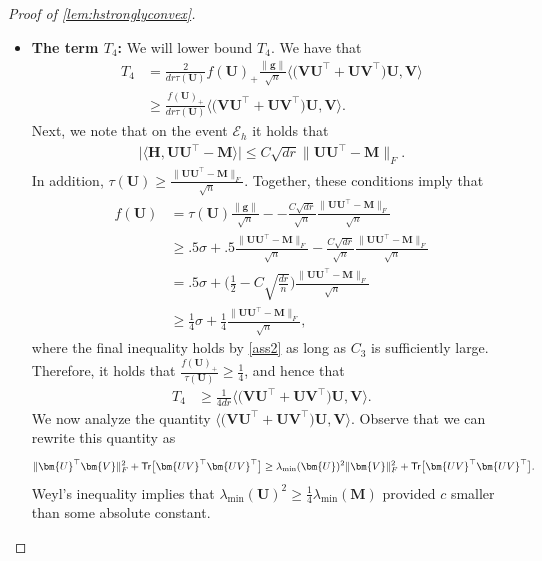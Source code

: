 \documentclass[10pt]{article}
\renewcommand{\t}{^{\top}}
\theoremstyle{definition}
\begin{document}
\begin{proof}[Proof of \cref{lem:hstronglyconvex}]
\begin{itemize}
\item \textbf{The term $T_4$:} We will lower bound $T_4$. We have that
\begin{align}
    T_4 &= \frac{2}{dr \tau(\bm{U})} f(\bm{U})_+ \frac{\|\bm{g}\|}{\sqrt{n}} \bigg \langle \bigg( \bm{VU}\t + \bm{UV}\t \bigg) \bm{U}, \bm{V} \bigg \rangle \\
    &\geq \frac{f(\bm{U})_+}{dr \tau(\bm{U})}  \bigg \langle \bigg( \bm{VU}\t + \bm{UV}\t \bigg) \bm{U}, \bm{V} \bigg \rangle.
\end{align}
Next, we note that on the event $\mathcal{E}_h$ it holds that
\begin{align}
    \bigg| \langle \bm{H}, \bm{UU}\t - \bm{M} \rangle \bigg| \leq C \sqrt{dr} \| \bm{UU}\t - \bm{M} \|_F.
\end{align}
In addition, $\tau(\bm{U}) \geq \frac{\|\bm{UU}\t - \bm{M}\|_F}{\sqrt{n}} $.  Together, these conditions imply that
\begin{align}
    f(\bm{U}) &= \tau(\bm{U}) \frac{\|\bm{g}\|}{\sqrt{n}} - - \frac{C \sqrt{dr}}{\sqrt{n}} \frac{\|\bm{UU}\t - \bm{M}\|_F}{\sqrt{n}}\\
    &\geq .5 \sigma + .5 \frac{\|\bm{UU}\t - \bm{M}\|_F}{\sqrt{n}} - \frac{C \sqrt{dr}}{\sqrt{n}} \frac{\|\bm{UU}\t - \bm{M}\|_F}{\sqrt{n}} \\
    &= .5\sigma + \bigg( \frac{1}{2} - C\sqrt{\frac{dr}{n}} \bigg) \frac{\|\bm{UU}\t - \bm{M}\|_F}{\sqrt{n}} \\
    &\geq \frac{1}{4} \sigma + \frac{1}{4} \frac{\|\bm{UU}\t - \bm{M}\|_F}{\sqrt{n}},
\end{align}
where the final inequality holds by \cref{ass2} as long as $C_3$ is sufficiently large.  Therefore, it holds that $\frac{f(\bm{U})_+}{\tau(\bm{U})} \geq \frac{1}{4}$, and hence that 
\begin{align}
    T_4 &\geq     
    \frac{1}{4dr} \bigg \langle \bigg( \bm{VU}\t + \bm{UV}\t \bigg) \bm{U}, \bm{V} \bigg \rangle. 
\end{align}
We now analyze the quantity $\bigg \langle \bigg( \bm{VU}\t + \bm{UV}\t \bigg) \bm{U}, \bm{V} \bigg \rangle$.  Observe that we can rewrite this quantity as
\begin{align}
    \| \bm{U}\t \bm{V} \|_F^2 + {\sf Tr}\big[ \bm{UV}\t \bm{UV}\t \big] \geq \lambda_{\min}(\bm{U})^2 \| \bm{V} \|_F^2 + {\sf Tr}\big[ \bm{UV}\t \bm{UV}\t \big].
\end{align}
Weyl's inequality implies that $\lambda_{\min}(\bm{U})^2 \geq \frac{1}{4} \lambda_{\min}(\bm{M})$ provided $c$ smaller than some absolute constant.  


\end{itemize}
\end{proof}
\end{document}

